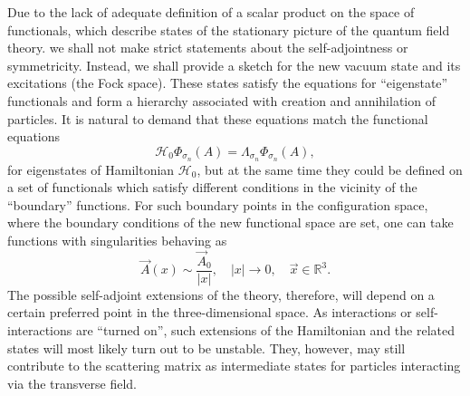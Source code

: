 \documentclass[12pt]{article}
\newcommand{\HH}{\mathscr{H}}
\newcommand{\RR}{\mathbb{R}}
\begin{document}
    Due to the lack of adequate definition of a scalar product on the space
    of functionals, which describe states of the stationary picture of the
    quantum field theory. we shall not make strict statements about the
    self-adjointness or symmetricity.
    Instead, we shall provide a sketch for the new vacuum state and its
    excitations (the Fock space).
    These states satisfy the equations for ``eigenstate'' functionals and
	form a hierarchy associated with creation and annihilation of particles.
	It is natural to demand that these equations match
	the functional equations
\begin{equation*}
    \HH_{0} \Phi_{\sigma_{n}}(A) = \Lambda_{\sigma_{n}} \Phi_{\sigma_{n}}(A) ,
\end{equation*}
	for eigenstates of Hamiltonian
$ \HH_{0} $,
	but at the same time they could be defined on a set of functionals
	which satisfy different conditions in the vicinity of the ``boundary''
    functions.
	For such boundary points in the configuration space,
	where the boundary conditions of the new functional space are set,
	one can take functions with singularities behaving as
\begin{equation}
\label{Asing}
    \vec{A}(x) \sim \frac{\vec{A}_{0}}{|x|}, \quad |x| \to 0 ,
	\quad \vec{x} \in \RR^{3} .
\end{equation}
	The possible self-adjoint extensions of the theory, therefore,
    will depend on a
	certain preferred point in the three-dimensional space.
	As interactions or self-interactions are ``turned on'',
	such extensions of the Hamiltonian and the related states will most
	likely turn out to be unstable.
	They, however, may still contribute to the scattering matrix as
	intermediate states for particles interacting via the transverse field.


\end{document}
